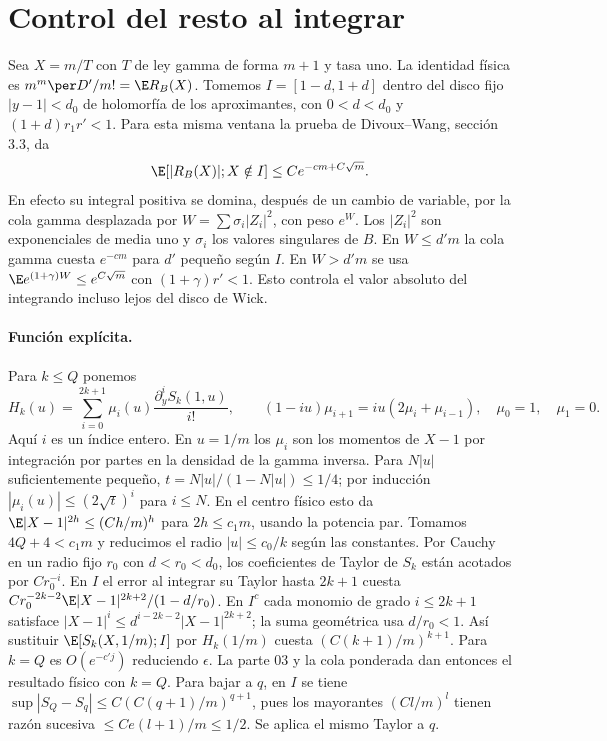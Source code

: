 \section{Control del resto al integrar}
Sea $X=m/T$ con $T$ de ley gamma de forma $m+1$ y tasa uno.
La identidad física es $m^m\per D'/m!=\E R_B(X)$.
Tomemos $I=[1-d,1+d]$ dentro del disco fijo $|y-1|<d_0$ de holomorfía
de los aproximantes, con $0<d<d_0$ y $(1+d)r_1r'<1$.
Para esta misma ventana la prueba de Divoux--Wang, sección 3.3, da
\[
 \E[|R_B(X)|;X\notin I]\le C e^{-c m+C\sqrt m}.
\]
En efecto su integral positiva se domina, después de un cambio de variable, por
la cola gamma desplazada por $W=\sum\sigma_i |Z_i|^2$, con peso $e^W$.
Los $|Z_i|^2$ son exponenciales de media uno y $\sigma_i$ los valores singulares de $B$.
En $W\le d'm$ la cola gamma cuesta $e^{-cm}$ para $d'$ pequeño según $I$.
En $W>d'm$ se usa $\E e^{(1+\gamma)W}\le e^{C\sqrt m}$ con $(1+\gamma)r'<1$.
Esto controla el valor absoluto del integrando incluso lejos del disco de Wick.
\paragraph{Función explícita.}
Para $k\le Q$ ponemos
\[
 H_k(u)=\sum_{i=0}^{2k+1}\mu_i(u)\frac{\partial_y^i S_k(1,u)}{i!},\qquad
 (1-iu)\mu_{i+1}=iu(2\mu_i+\mu_{i-1}),\quad \mu_0=1,\quad \mu_1=0 .
\]
Aquí $i$ es un índice entero. En $u=1/m$ los $\mu_i$ son los momentos de $X-1$
por integración por partes en la densidad de la gamma inversa.
Para $N|u|$ suficientemente pequeño, $t=N|u|/(1-N|u|)\le1/4$; por inducción
$|\mu_i(u)|\le(2\sqrt t)^i$ para $i\le N$. En el centro físico esto da
$\E|X-1|^{2h}\le (Ch/m)^h$ para $2h\le c_1m$, usando la potencia par.
Tomamos $4Q+4<c_1m$ y reducimos el radio $|u|\le c_0/k$ según las constantes.
Por Cauchy en un radio fijo $r_0$ con $d<r_0<d_0$, los coeficientes de Taylor de
$S_k$ están acotados por $Cr_0^{-i}$.
En $I$ el error al integrar su Taylor hasta $2k+1$ cuesta
$C r_0^{-2k-2}\E|X-1|^{2k+2}/(1-d/r_0)$.
En $I^c$ cada monomio de grado $i\le2k+1$ satisface
$|X-1|^i\le d^{i-2k-2}|X-1|^{2k+2}$; la suma geométrica usa $d/r_0<1$.
Así sustituir $\E[S_k(X,1/m);I]$ por $H_k(1/m)$ cuesta
$(C(k+1)/m)^{k+1}$. Para $k=Q$ es $O(e^{-c'j})$ reduciendo $\epsilon$.
La parte 03 y la cola ponderada dan entonces el resultado físico con $k=Q$.
Para bajar a $q$, en $I$ se tiene
$\sup|S_Q-S_q|\le C(C(q+1)/m)^{q+1}$, pues los mayorantes $(Cl/m)^l$
tienen razón sucesiva $\le Ce(l+1)/m\le1/2$. Se aplica el mismo Taylor a $q$.
